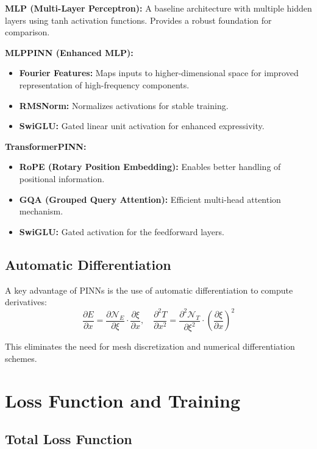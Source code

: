\documentclass[11pt,a4paper]{article}
\begin{document}
\textbf{MLP (Multi-Layer Perceptron):} A baseline architecture with multiple hidden layers using tanh activation functions. Provides a robust foundation for comparison.

\textbf{MLPPINN (Enhanced MLP):}
\begin{itemize}
    \item \textbf{Fourier Features:} Maps inputs to higher-dimensional space for improved representation of high-frequency components.
    \item \textbf{RMSNorm:} Normalizes activations for stable training.
    \item \textbf{SwiGLU:} Gated linear unit activation for enhanced expressivity.
\end{itemize}

\textbf{TransformerPINN:}
\begin{itemize}
    \item \textbf{RoPE (Rotary Position Embedding):} Enables better handling of positional information.
    \item \textbf{GQA (Grouped Query Attention):} Efficient multi-head attention mechanism.
    \item \textbf{SwiGLU:} Gated activation for the feedforward layers.
\end{itemize}

\subsection{Automatic Differentiation}

A key advantage of PINNs is the use of automatic differentiation to compute derivatives:
\begin{equation}
    \frac{\partial E}{\partial x} = \frac{\partial \mathcal{N}_E}{\partial \xi} \cdot \frac{\partial \xi}{\partial x}, \quad \frac{\partial^2 T}{\partial x^2} = \frac{\partial^2 \mathcal{N}_T}{\partial \xi^2} \cdot \left(\frac{\partial \xi}{\partial x}\right)^2
\end{equation}

This eliminates the need for mesh discretization and numerical differentiation schemes.

\section{Loss Function and Training}

\subsection{Total Loss Function}
\end{document}
